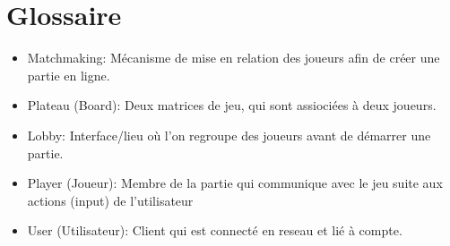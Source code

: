 \documentclass[../introduction.tex]{subfiles}
\begin{document}
\section{Glossaire}
\begin{itemize}
    \item Matchmaking: Mécanisme de mise en relation des joueurs afin de créer une partie en ligne.
    \item Plateau (Board): Deux matrices de jeu, qui sont assiociées à deux joueurs.
    \item Lobby: Interface/lieu où l'on regroupe des joueurs avant de démarrer une partie.
	\item Player (Joueur): Membre de la partie qui communique avec le jeu suite aux actions (input) de l'utilisateur
    \item User (Utilisateur): Client qui est connecté en reseau et lié à compte.
\end{itemize}
\end{document}
